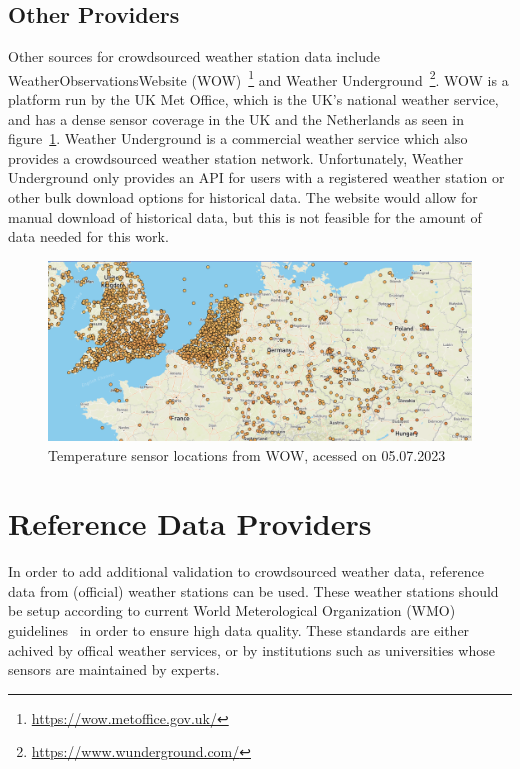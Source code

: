 \subsection{Other Providers}

Other sources for crowdsourced weather station data include WeatherObservationsWebsite (WOW)~\footnote{\url{https://wow.metoffice.gov.uk/}} and Weather Underground~\footnote{\url{https://www.wunderground.com/}}.
WOW is a platform run by the UK Met Office, which is the UK's national weather service, and has a dense sensor coverage in the UK and the Netherlands as seen in figure~\ref{fig:wow sensor locations}.
Weather Underground is a commercial weather service which also provides a crowdsourced weather station network. Unfortunately, Weather Underground only provides an API for users with a registered weather station or other bulk download options for historical data. The website would allow for manual download of historical data, but this is not feasible for the amount of data needed for this work.

\begin{figure}[ht]
    \centering
    \includegraphics[width=1\textwidth]{images/wow_sensor_locations.png}
    \caption{Temperature sensor locations from WOW, acessed on 05.07.2023}
    \label{fig:wow sensor locations}
\end{figure}

\section{Reference Data Providers}

In order to add additional validation to crowdsourced weather data, reference data from (official) weather stations can be used. These weather stations should be setup according to current World Meterological Organization (WMO) guidelines~\cite{wmo2018guide} in order to ensure high data quality. These standards are either achived by offical weather services, or by institutions such as universities whose sensors are maintained by experts.

